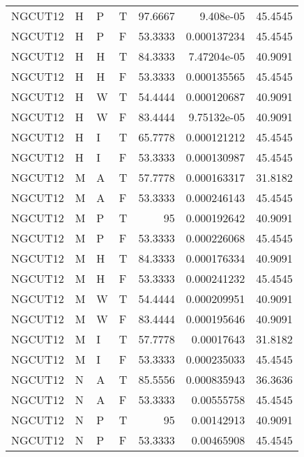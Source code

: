 \begin{longtable}{llllrrr}
    NGCUT12  & H     & P     & T          & 97.6667    & 9.408e-05   & 45.4545  \\
    NGCUT12  & H     & P     & F          & 53.3333    & 0.000137234 & 45.4545  \\
    NGCUT12  & H     & H     & T          & 84.3333    & 7.47204e-05 & 40.9091  \\
    NGCUT12  & H     & H     & F          & 53.3333    & 0.000135565 & 45.4545  \\
    NGCUT12  & H     & W     & T          & 54.4444    & 0.000120687 & 40.9091  \\
    NGCUT12  & H     & W     & F          & 83.4444    & 9.75132e-05 & 40.9091  \\
    NGCUT12  & H     & I     & T          & 65.7778    & 0.000121212 & 45.4545  \\
    NGCUT12  & H     & I     & F          & 53.3333    & 0.000130987 & 45.4545  \\
    NGCUT12  & M     & A     & T          & 57.7778    & 0.000163317 & 31.8182  \\
    NGCUT12  & M     & A     & F          & 53.3333    & 0.000246143 & 45.4545  \\
    NGCUT12  & M     & P     & T          & 95         & 0.000192642 & 40.9091  \\
    NGCUT12  & M     & P     & F          & 53.3333    & 0.000226068 & 45.4545  \\
    NGCUT12  & M     & H     & T          & 84.3333    & 0.000176334 & 40.9091  \\
    NGCUT12  & M     & H     & F          & 53.3333    & 0.000241232 & 45.4545  \\
    NGCUT12  & M     & W     & T          & 54.4444    & 0.000209951 & 40.9091  \\
    NGCUT12  & M     & W     & F          & 83.4444    & 0.000195646 & 40.9091  \\
    NGCUT12  & M     & I     & T          & 57.7778    & 0.00017643  & 31.8182  \\
    NGCUT12  & M     & I     & F          & 53.3333    & 0.000235033 & 45.4545  \\
    NGCUT12  & N     & A     & T          & 85.5556    & 0.000835943 & 36.3636  \\
    NGCUT12  & N     & A     & F          & 53.3333    & 0.00555758  & 45.4545  \\
    NGCUT12  & N     & P     & T          & 95         & 0.00142913  & 40.9091  \\
    NGCUT12  & N     & P     & F          & 53.3333    & 0.00465908  & 45.4545  \\

\end{longtable}
